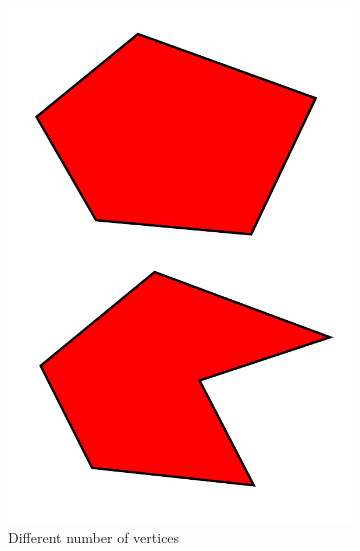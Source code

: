 \begin{figure}[h!]
    \centering
    \begin{subfigure}{.3\textwidth}
        \centering
        \includegraphics[width=\textwidth]{images/fail_first_test.pdf}
        \caption{Different number of vertices}
    \end{subfigure}
    \hfill
    \begin{subfigure}{.3\textwidth}
        \centering

\end{subfigure}
\end{figure}
